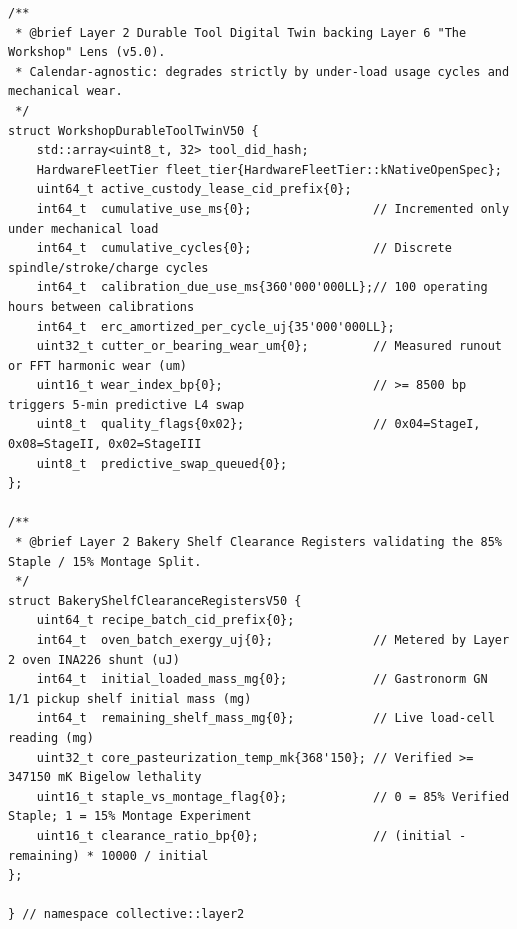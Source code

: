 \begin{lstlisting}
/**
 * @brief Layer 2 Durable Tool Digital Twin backing Layer 6 "The Workshop" Lens (v5.0).
 * Calendar-agnostic: degrades strictly by under-load usage cycles and mechanical wear.
 */
struct WorkshopDurableToolTwinV50 {
    std::array<uint8_t, 32> tool_did_hash;
    HardwareFleetTier fleet_tier{HardwareFleetTier::kNativeOpenSpec};
    uint64_t active_custody_lease_cid_prefix{0};
    int64_t  cumulative_use_ms{0};                 // Incremented only under mechanical load
    int64_t  cumulative_cycles{0};                 // Discrete spindle/stroke/charge cycles
    int64_t  calibration_due_use_ms{360'000'000LL};// 100 operating hours between calibrations
    int64_t  erc_amortized_per_cycle_uj{35'000'000LL};
    uint32_t cutter_or_bearing_wear_um{0};         // Measured runout or FFT harmonic wear (um)
    uint16_t wear_index_bp{0};                     // >= 8500 bp triggers 5-min predictive L4 swap
    uint8_t  quality_flags{0x02};                  // 0x04=StageI, 0x08=StageII, 0x02=StageIII
    uint8_t  predictive_swap_queued{0};
};

/**
 * @brief Layer 2 Bakery Shelf Clearance Registers validating the 85% Staple / 15% Montage Split.
 */
struct BakeryShelfClearanceRegistersV50 {
    uint64_t recipe_batch_cid_prefix{0};
    int64_t  oven_batch_exergy_uj{0};              // Metered by Layer 2 oven INA226 shunt (uJ)
    int64_t  initial_loaded_mass_mg{0};            // Gastronorm GN 1/1 pickup shelf initial mass (mg)
    int64_t  remaining_shelf_mass_mg{0};           // Live load-cell reading (mg)
    uint32_t core_pasteurization_temp_mk{368'150}; // Verified >= 347150 mK Bigelow lethality
    uint16_t staple_vs_montage_flag{0};            // 0 = 85% Verified Staple; 1 = 15% Montage Experiment
    uint16_t clearance_ratio_bp{0};                // (initial - remaining) * 10000 / initial
};

} // namespace collective::layer2
\end{lstlisting}
